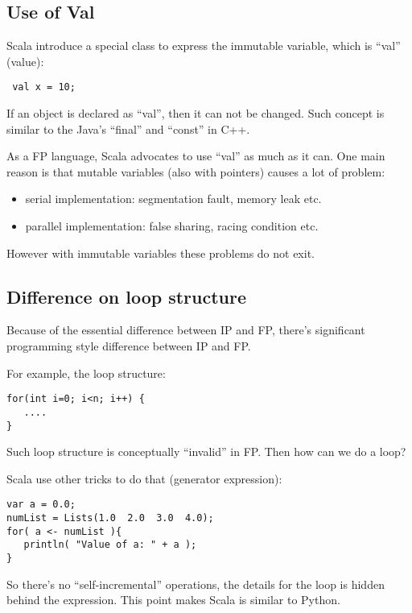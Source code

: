 \documentclass[notheorems, aspectratio=54]{beamer}
\begin{document}
\subsection{Use of Val}
\begin{frame}[fragile]

Scala introduce a special class to express the immutable variable, 
which is ``val'' (value):
\begin{verbatim}
 val x = 10;
\end{verbatim}
If an object is declared as ``val'', then it can not be changed. Such concept 
is similar to the Java's ``final'' and ``const'' in C++. 

As a FP language, Scala advocates to use ``val'' as much as it can. One main reason is that mutable variables (also with pointers) causes a lot of problem:
\begin{itemize}
 \item serial implementation: segmentation fault, memory leak etc.
 \item parallel implementation: false sharing, racing condition etc.
\end{itemize}
However with immutable variables these problems do not exit.

\end{frame}

\subsection{Difference on loop structure}
\begin{frame}[fragile]

Because of the essential difference between IP and FP, there's 
significant programming style difference between IP and FP. 

For example, the loop structure:
\begin{verbatim}
for(int i=0; i<n; i++) {
   ....
}
\end{verbatim}
Such loop structure is conceptually ``invalid'' in FP. Then how can we do a loop?

Scala use other tricks to do that (generator expression):
\begin{verbatim}
var a = 0.0;
numList = Lists(1.0  2.0  3.0  4.0);
for( a <- numList ){
   println( "Value of a: " + a );
} 
\end{verbatim}
So there's no ``self-incremental'' operations, the details for the loop is hidden behind the expression. This point makes Scala is similar to Python. 

\end{frame}
\end{document}
